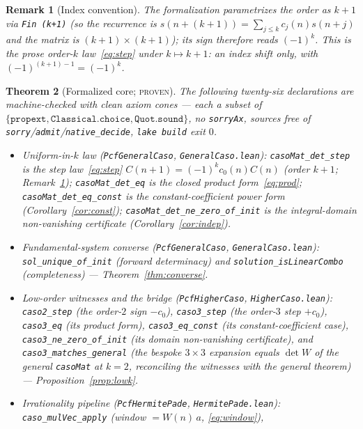 \documentclass[11pt]{article}
\newtheorem{theorem}{Theorem}
\newtheorem{remark}[theorem]{Remark}
\newcommand{\Caso}{C}
\newcommand{\CasoM}{W}
\begin{document}
\begin{remark}[Index convention]\label{rem:index}
The formalization parametrizes the order as $k+1$ via \texttt{Fin (k+1)} (so the
recurrence is $s(n+(k+1))=\sum_{j\le k}c_j(n)s(n+j)$ and the matrix is
$(k+1)\times(k+1)$); its sign therefore reads $(-1)^{k}$. This is the prose order-$k$
law~\eqref{eq:step} under $k\mapsto k+1$: an index shift only, with $(-1)^{(k+1)-1}
=(-1)^k$.
\end{remark}

\begin{theorem}[Formalized core; \textsc{proven}]\label{thm:lean}
The following twenty-six declarations are machine-checked with clean axiom cones ---
each a subset of $\{\texttt{propext},\texttt{Classical.choice},\texttt{Quot.sound}\}$, no
\texttt{sorryAx}, sources free of \texttt{sorry}/\texttt{admit}/\texttt{native\_decide},
\texttt{lake build} exit $0$.
\begin{itemize}\sloppy
\item \emph{Uniform-in-$k$ law} (\texttt{PcfGeneralCaso}, \texttt{GeneralCaso.lean}):
\texttt{casoMat\_det\_step} is the step law~\eqref{eq:step}
$\Caso(n+1)=(-1)^{k}c_0(n)\Caso(n)$ (order $k+1$; Remark~\ref{rem:index});
\texttt{casoMat\_det\_eq} is the closed product form~\eqref{eq:prod};
\texttt{casoMat\_det\_eq\_const} is the constant-coefficient power form
(Corollary~\ref{cor:const}); \texttt{casoMat\_det\_ne\_zero\_of\_init} is the
integral-domain non-vanishing certificate (Corollary~\ref{cor:indep}).
\item \emph{Fundamental-system converse} (\texttt{PcfGeneralCaso},
\texttt{GeneralCaso.lean}): \texttt{sol\_unique\_of\_init} (forward determinacy) and
\texttt{solution\_isLinearCombo} (completeness) --- Theorem~\ref{thm:converse}.
\item \emph{Low-order witnesses and the bridge} (\texttt{PcfHigherCaso},
\texttt{HigherCaso.lean}):
\texttt{caso2\_step} (the order-$2$ sign $-c_0$), \texttt{caso3\_step} (the order-$3$
step $+c_0$), \texttt{caso3\_eq} (its product form), \texttt{caso3\_eq\_const} (its
constant-coefficient case), \texttt{caso3\_ne\_zero\_of\_init} (its domain
non-vanishing certificate), and \texttt{caso3\_matches\_general} (the bespoke
$3\times3$ expansion equals $\det\CasoM$ of the general \texttt{casoMat} at $k=2$,
reconciling the witnesses with the general theorem) --- Proposition~\ref{prop:lowk}.
\item \emph{Irrationality pipeline} (\texttt{PcfHermitePade}, \texttt{HermitePade.lean}):
\texttt{caso\_mulVec\_apply} (window $=\CasoM(n)\,a$, \eqref{eq:window}),

\end{itemize}
\end{theorem}
\end{document}
